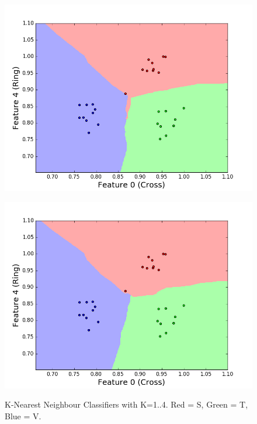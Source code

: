 \documentclass[11pt, a4paper]{article}
\begin{document}
\begin{figure}[!h]
\begin{minipage}[b]{.5\textwidth}
\label{fig:trainb}
\end{minipage}
\begin{minipage}[b]{.5\textwidth}
\centering
\includegraphics[width=1\textwidth]{training_plot_k3.png}
\label{fig:trainc}
\end{minipage}%
\begin{minipage}[b]{.5\textwidth}
\centering
\includegraphics[width=1\textwidth]{training_plot_k4.png}
\label{fig:traind}
\end{minipage}
\caption{K-Nearest Neighbour Classifiers with K=1..4. Red = S, Green = T, Blue = V.}\label{fig:train}
\end{figure}
\end{document}
